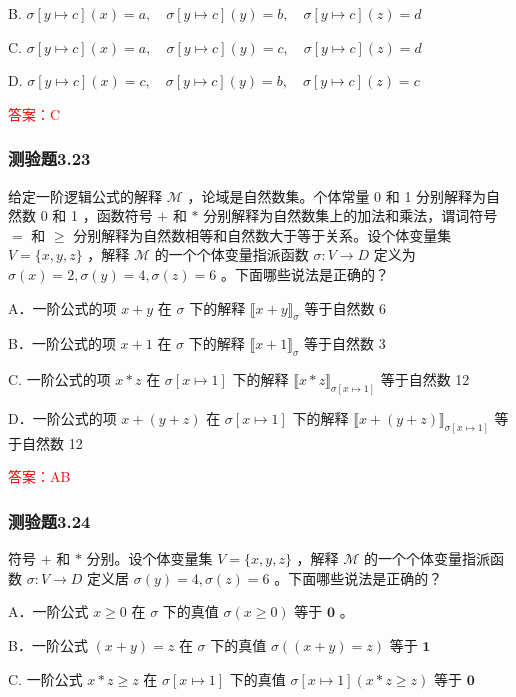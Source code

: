 \documentclass[UTF8, heading=true]{ctexart}
\begin{document}
B. $\sigma[y \mapsto c](x)=a, \quad \sigma[y \mapsto c](y)=b, \quad \sigma[y \mapsto c](z)=d$ 

C. $\sigma[y \mapsto c](x)=a, \quad \sigma[y \mapsto c](y)=c, \quad \sigma[y \mapsto c](z)=d$ 

D. $\sigma[y \mapsto c](x)=c, \quad \sigma[y \mapsto c](y)=b, \quad \sigma[y \mapsto c](z)=c$

\textcolor{red}{答案：C}

\subsubsection{测验题3.23}

给定一阶逻辑公式的解释 $\mathcal{M}$ ，论域是自然数集。个体常量 0 和 1 分别解释为自然数 0 和 1 ，函数符号 $+$ 和 $*$ 分别解释为自然数集上的加法和乘法，谓词符号 $=$ 和 $\geq$ 分别解释为自然数相等和自然数大于等于关系。设个体变量集 $V=\{x, y, z\}$ ，解释 $\mathcal{M}$ 的一个个体变量指派函数 $\sigma: V \rightarrow D$ 定义为 $\sigma(x)=2, \sigma(y)=4, \sigma(z)=6$ 。下面哪些说法是正确的？

A．一阶公式的项 $x+y$ 在 $\sigma$ 下的解释 $\llbracket x+y \rrbracket_\sigma$ 等于自然数 6

B．一阶公式的项 $x+1$ 在 $\sigma$ 下的解释 $\llbracket x+1 \rrbracket_\sigma$ 等于自然数 3

C. 一阶公式的项 $x * z$ 在 $\sigma[x \mapsto 1]$ 下的解释 $\llbracket x * z \rrbracket_{\sigma[x \mapsto 1]}$ 等于自然数 12

D．一阶公式的项 $x+(y+z)$ 在 $\sigma[x \mapsto 1]$ 下的解释 $\llbracket x+(y+z) \rrbracket_{\sigma[x \mapsto 1]}$ 等于自然数 12

\textcolor{red}{答案：AB}

\subsubsection{测验题3.24}

符号 $+$ 和 $*$ 分别。设个体变量集 $V=\{x, y, z\}$ ，解释 $\mathcal{M}$ 的一个个体变量指派函数 $\sigma: V \rightarrow D$ 定义居 $\sigma(y)=4, \sigma(z)=6$ 。下面哪些说法是正确的？

A．一阶公式 $x \geq 0$ 在 $\sigma$ 下的真值 $\sigma(x \geq 0)$ 等于 $\mathbf{0}$ 。

B．一阶公式 $(x+y)=z$ 在 $\sigma$ 下的真值 $\sigma((x+y)=z)$ 等于 $\mathbf{1}$

C. 一阶公式 $x * z \geq z$ 在 $\sigma[x \mapsto 1]$ 下的真值 $\sigma[x \mapsto 1](x * z \geq z)$ 等于 $\mathbf{0}$
\end{document}
